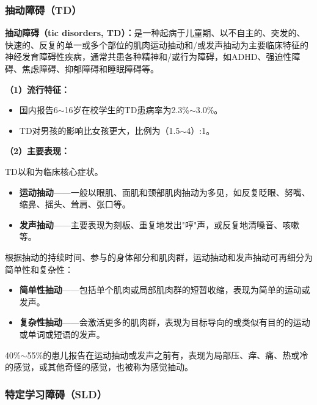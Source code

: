 \subsubsection{抽动障碍（TD）}

\begin{keybox}
\textbf{抽动障碍（tic disorders, TD）：}是一种起病于儿童期、以不自主的、突发的、快速的、反复的单一或多个部位的肌肉运动抽动和/或发声抽动为主要临床特征的神经发育障碍性疾病，通常共患各种精神和/或行为障碍，如ADHD、强迫性障碍、焦虑障碍、抑郁障碍和睡眠障碍等。

\vspace{4pt}
\textbf{（1）流行特征：}

\begin{itemize}[leftmargin=*]
    \item 国内报告6$\sim$16岁在校学生的TD患病率为2.3\%$\sim$3.0\%。
    \item TD对男孩的影响比女孩更大，比例为（1.5$\sim$4）:1。
\end{itemize}

\vspace{4pt}
\textbf{（2）主要表现：}

TD以和为临床核心症状。

\begin{itemize}[leftmargin=*]
    \item \textbf{运动抽动}——一般以眼肌、面肌和颈部肌肉抽动为多见，如反复眨眼、努嘴、缩鼻、摇头、耸肩、张口等。
    \item \textbf{发声抽动}——主要表现为刻板、重复地发出"哼"声，或反复地清嗓音、咳嗽等。
\end{itemize}

根据抽动的持续时间、参与的身体部分和肌肉群，运动抽动和发声抽动可再细分为简单性和复杂性：
\begin{itemize}[leftmargin=*]
    \item \textbf{简单性抽动}——包括单个肌肉或局部肌肉群的短暂收缩，表现为简单的运动或发声。
    \item \textbf{复杂性抽动}——会激活更多的肌肉群，表现为目标导向的或类似有目的的运动或单词或短语的发声。
\end{itemize}

40\%$\sim$55\%的患儿报告在运动抽动或发声之前有，表现为局部压、痒、痛、热或冷的感觉，或其他奇怪的感觉，也被称为感觉抽动。
\end{keybox}

\subsubsection{特定学习障碍（SLD）}

